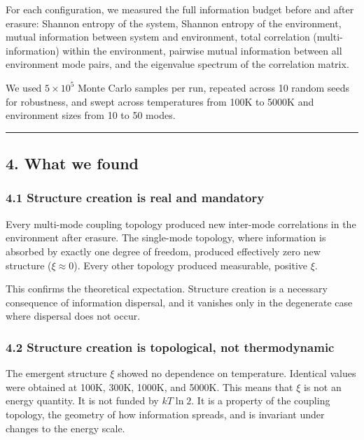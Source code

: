 \documentclass[
  11pt,
  a4paper]{article}
\begin{document}
For each configuration, we measured the full information budget before
and after erasure: Shannon entropy of the system, Shannon entropy of the
environment, mutual information between system and environment, total
correlation (multi-information) within the environment, pairwise mutual
information between all environment mode pairs, and the eigenvalue
spectrum of the correlation matrix.

We used \(5 \times 10^5\) Monte Carlo samples per run, repeated across
10 random seeds for robustness, and swept across temperatures from 100K
to 5000K and environment sizes from 10 to 50 modes.

\begin{center}\rule{0.5\linewidth}{0.5pt}\end{center}

\subsection{4. What we found}\label{what-we-found}

\subsubsection{4.1 Structure creation is real and
mandatory}\label{structure-creation-is-real-and-mandatory}

Every multi-mode coupling topology produced new inter-mode correlations
in the environment after erasure. The single-mode topology, where
information is absorbed by exactly one degree of freedom, produced
effectively zero new structure (\(\xi \approx 0\)). Every other topology
produced measurable, positive \(\xi\).

This confirms the theoretical expectation. Structure creation is a
necessary consequence of information dispersal, and it vanishes only in
the degenerate case where dispersal does not occur.

\subsubsection{4.2 Structure creation is topological, not
thermodynamic}\label{structure-creation-is-topological-not-thermodynamic}

The emergent structure \(\xi\) showed no dependence on temperature.
Identical values were obtained at 100K, 300K, 1000K, and 5000K. This
means that \(\xi\) is not an energy quantity. It is not funded by
\(kT \ln 2\). It is a property of the coupling topology, the geometry of
how information spreads, and is invariant under changes to the energy
scale.
\end{document}
